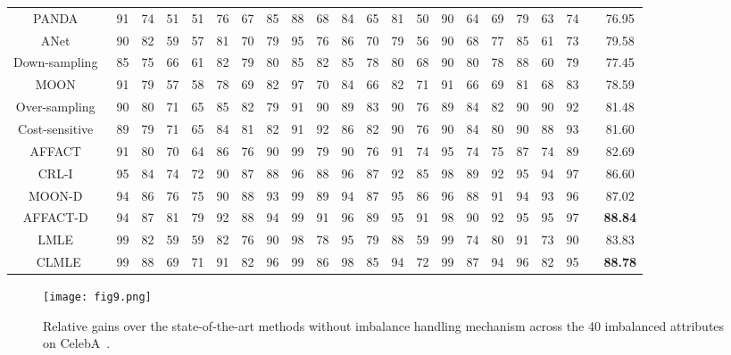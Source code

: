\documentclass[10pt,journal,compsoc]{IEEEtran}
\begin{document}
\begin{table*}[t]
{\begin{tabular}{c|c|c|c|c|c|c|c|c|c|c|c|c|c|c|c|c|c|c|c|c|c}
 PANDA~\cite{Ning14} & 91&  74& 51& 51& 76& 67& 85& 88& 68& 84& 65& 81& 50& 90& 64& 69& 79& 63& 74  &    & 76.95 \\
 ANet~\cite{liu15} & 90&  82& 59& 57& 81& 70& 79& 95& 76& 86& 70& 79& 56& 90& 68& 77& 85& 61& 73&    & 79.58 \\ \hline
Down-sampling~\cite{Drummond03} & 85&  75& 66& 61& 82& 79& 80& 85& 82& 85& 78& 80& 68& 90& 80& 78& 88& 60&  79&  & 77.45 \\
MOON~\cite{Rudd2016} & 91 & 79 & 57 & 58 & 78 & 69 & 82 & 97 & 70 & 84 & 66 & 82 & 71 & 91 & 66 & 69 & 81 & 68 & 83 & & 78.59 \\
Over-sampling~\cite{Drummond03} & 90&  80& 71& 65& 85& 82& 79& 91& 90& 89& 83& 90& 76& 89& 84& 82& 90& 90&  92&  & 81.48 \\
Cost-sensitive~\cite{He09}      & 89&  79& 71& 65& 84& 81& 82& 91& 92& 86& 82& 90& 76& 90& 84& 80& 90& 88&  93&  & 81.60 \\
AFFACT~\cite{guenther2017affact} & 91 & 80 & 70 & 64 & 86 & 76 & 90 & 99 & 79 & 90 & 76 & 91 & 74 & 95 & 74 & 75 & 87 & 74 & 89 & & 82.69 \\ 
CRL-I~\cite{Dong_2017_ICCV}     & 95&  84& 74& 72& 90& 87& 88& 96& 88& 96& 87& 92& 85& 98& 89& 92& 95& 94&  97&  & 86.60 \\
MOON-D~\cite{Rudd2016} & 94 & 86 & 76 & 75 & 90 & 88 & 93 & 99 & 89 & 94 & 87 & 95 & 86 & 96 & 88 & 91 & 94 & 93 & 96 & & 87.02 \\
AFFACT-D~\cite{guenther2017affact} & 94 & 87 & 81 & 79 & 92 & 88 & 94 & 99 & 91 & 96 & 89 & 95 & 91 & 98 & 90 & 92 & 95 & 95 & 97 & & \textbf{88.84} \\\hline
LMLE~\cite{huang2016lmle} & 99& 82& 59& 59& 82& 76& 90& 98& 78& 95& 79& 88& 59& 99& 74& 80& 91& 73& 90  &    & 83.83 \\
CLMLE & 99&88&69&71&91&82&96&99&86&98&85&94&72&99&87&94&96&82&95 & & \textbf{88.78} \\ \hline
\end{tabular}
}
\label{tb5}
\vspace{-1em}
\end{table*}

\begin{figure}[t]
\begin{center}
\texttt{[image: fig9.png]}
\end{center}
\vspace{-1.5em}
\caption{Relative gains over the state-of-the-art methods without imbalance handling mechanism across the 40 imbalanced attributes on CelebA~\cite{liu15}.}
\label{fig9}
\end{figure}
\end{document}
